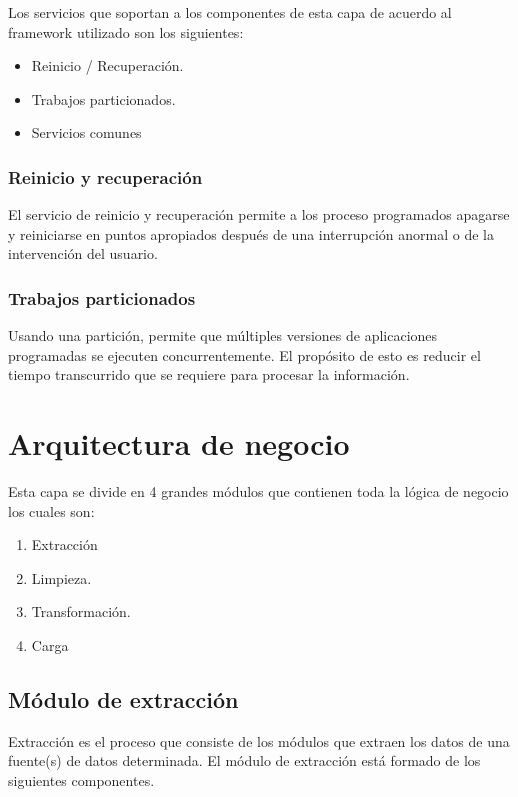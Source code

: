 Los servicios que soportan a los componentes de esta capa de acuerdo al
framework utilizado son los siguientes:

\begin{itemize}
\item Reinicio / Recuperación.
\item Trabajos particionados.
\item Servicios comunes
\end{itemize}

\subsubsection{Reinicio y recuperación}

El servicio de reinicio y recuperación permite a los proceso programados
apagarse y reiniciarse en puntos apropiados después de una interrupción anormal
o de la intervención del usuario.

\subsubsection{Trabajos particionados}

Usando una partición, permite que múltiples versiones de aplicaciones
programadas se ejecuten concurrentemente. El propósito de esto es reducir el
tiempo transcurrido que se requiere para procesar la información.

\section{Arquitectura de negocio}

Esta capa se divide en 4 grandes módulos que contienen toda la lógica de negocio
los cuales son:

\begin{enumerate}
\item Extracción
\item Limpieza.
\item Transformación.
\item Carga
\end{enumerate}

\subsection{Módulo de extracción}

Extracción es el proceso que consiste de los módulos que extraen los datos de
una fuente(s) de datos determinada.  El módulo de extracción está formado de los
siguientes componentes.

